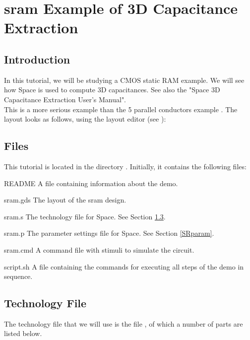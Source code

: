 \chapter{sram Example of 3D Capacitance Extraction}
\section{Introduction}
\label{SRintro}
In this tutorial, we will be studying a CMOS static RAM example.
We will see how Space is used to compute 3D capacitances.
See also the "Space 3D Capacitance Extraction User's Manual".
\\[1 ex]
This is a more serious example than the 5 parallel conductors example .
The layout looks as follows, using the layout editor  (see ):

\begin{figure}[h]
\centerline{}
\end{figure}

\section{Files}
This tutorial is located in the directory .
Initially, it contains the following files:
\begin{filelist}
\item[README] A file containing information about the demo.
\item[sram.gds] The layout of the sram design.
\item[sram.s] The technology file for Space. See Section \ref{SRtech}.
\item[sram.p] The parameter settings file for Space. See Section \ref{SRparam}.
\item[sram.cmd] A command file with stimuli to simulate the circuit.
\item[script.sh] A file containing the commands for executing all
steps of the demo in sequence.
\end{filelist}

\section{Technology File}
\label{SRtech}
The technology file that we will use is the file ,
of which a number of parts are listed below.

